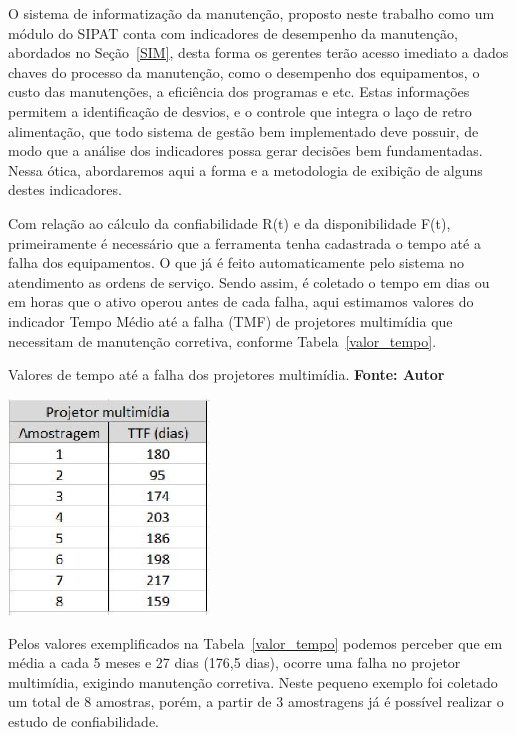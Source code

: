 O sistema de informatização da manutenção, proposto neste trabalho como um módulo do SIPAT conta com indicadores de desempenho da manutenção, abordados no Seção~\ref{SIM}, desta forma os gerentes terão acesso imediato a dados chaves do processo da manutenção, como o desempenho dos equipamentos, o custo das manutenções, a eficiência dos programas e etc. Estas informações permitem a identificação de desvios, e o controle que integra o laço de retro alimentação, que todo sistema de gestão bem implementado deve possuir, de modo que a análise dos indicadores possa gerar decisões bem fundamentadas. Nessa ótica, abordaremos aqui a forma e a metodologia de exibição de alguns destes indicadores.

Com relação ao cálculo da confiabilidade R(t) e da disponibilidade F(t), primeiramente é necessário que a ferramenta tenha cadastrada o tempo até a falha dos equipamentos. O que já é feito automaticamente pelo sistema no atendimento as ordens de serviço. Sendo assim, é coletado o tempo em dias ou em horas que o ativo operou antes de cada falha, aqui estimamos valores do indicador Tempo Médio até a falha (TMF) de projetores multimídia que necessitam de manutenção corretiva, conforme Tabela~\ref{valor_tempo}. 

\graphicspath{{figuras/}}	
\begin{table}[H]
\centering
\caption{Valores de tempo até a falha dos projetores multimídia. \textbf{Fonte: Autor}}
\includegraphics[width=0.4\textwidth]{valores_tempo_falha.eps}
\label{valor_tempo}
\end{table}

Pelos valores exemplificados na Tabela~\ref{valor_tempo} podemos perceber que em média a cada 5 meses e 27 dias (176,5 dias), ocorre uma falha no projetor multimídia, exigindo manutenção corretiva. Neste pequeno exemplo foi coletado um total de 8 amostras, porém, a partir de 3 amostragens já é possível realizar o estudo de confiabilidade.

